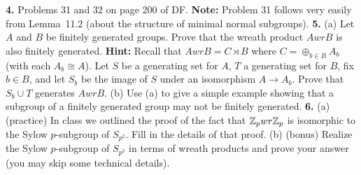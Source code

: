\documentclass[12pt]{article}
\begin{document}
\skv
{\bf 4.} Problems 31 and 32 on page 200 of DF. {\bf Note:} Problem 31 follows
very easily from Lemma~11.2 (about the structure of minimal normal subgroups).
\skv
{\bf 5.} (a) Let $A$ and $B$ be finitely generated groups. Prove that the wreath product $A wr B$
is also finitely generated.
{\bf Hint:} Recall that $A wr B=C\rtimes B$ where $C=\oplus_{b\in B}A_b$ (with each $A_b\cong A$). Let $S$
be a generating set for $A$, $T$ a generating set for $B$, fix $b\in B$, and let $S_b$ be the image
of $S$ under an isomorphism $A\to A_b$. Prove that $S_b\cup T$ generates $A wr B$.
\skv
(b) Use (a) to give a simple example showing that a subgroup of a finitely generated group
may not be finitely generated.
\skv
{\bf 6. }(a) (practice) In class we outlined the proof of the fact that ${\mathbb Z}_p wr {\mathbb Z}_p$
is isomorphic to the Sylow $p$-subgroup of $S_{p^2}$. Fill in the details of that proof.
\skv
(b) (bonus) Realize the Sylow $p$-subgroup of $S_{p^3}$ in terms of wreath products and prove
your answer (you may skip some technical details). 
\end{document}
